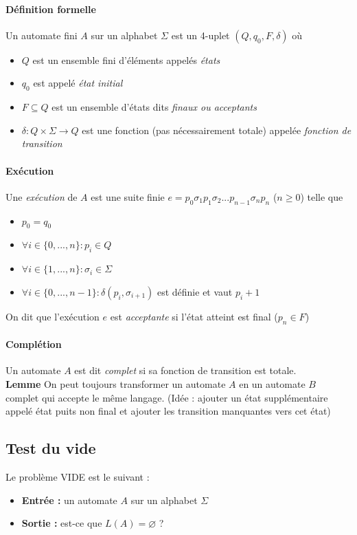 \documentclass[a4paper]{article}
\begin{document}
  \paragraph{Définition formelle} Un automate fini $A$ sur un alphabet 
$\Sigma$
  est un 4-uplet $(Q, q_0, F, \delta)$ où
  \begin{itemize}
    \item $Q$ est un ensemble fini d'éléments appelés \textit{états}
    \item $q_0$ est appelé \textit{état initial}
    \item $F \subseteq Q$ est un ensemble d'états dits \textit{finaux ou 
acceptants}
    \item $\delta : Q \times \Sigma \rightarrow Q $ est une fonction 
(pas nécessairement totale)
    appelée \textit{fonction de transition}
  \end{itemize}

  \paragraph{Exécution} Une \textit{exécution} de $A$ est une suite 
finie 
  $e = p_0 \sigma_1 p_1 \sigma_2 ... p_{n-1} \sigma_n p_n$ ($n \geq 0$) 
telle que
  \begin{itemize}
    \item $p_0 = q_0$
    \item $\forall i \in \{0,...,n\} : p_i \in Q$
    \item $\forall i \in \{1,...,n\} : \sigma_i \in \Sigma$
    \item $\forall i \in \{0,...,n-1\} : \delta(p_i, \sigma_{i+1})$ est 
définie
    et vaut $p_i+1$
  \end{itemize}
  On dit que l'exécution $e$ est \textit{acceptante} si l'état atteint 
est final ($p_n \in F$)

  \paragraph{Complétion} Un automate $A$ est dit \textit{complet} si sa 
fonction de
  transition est totale.\\

  \textbf{Lemme} On peut toujours transformer un automate $A$ en un 
automate $B$
  complet qui accepte le même langage. (Idée : ajouter un état 
supplémentaire 
  appelé état puits non final et ajouter les transition manquantes vers 
cet état)

  \subsection{Test du vide}
  Le problème VIDE est le suivant :
  \begin{itemize}
    \item \textbf{Entrée :} un automate $A$ sur un alphabet $\Sigma$
    \item \textbf{Sortie :} est-ce que $L(A) = \varnothing$ ?
  \end{itemize}
\end{document}
